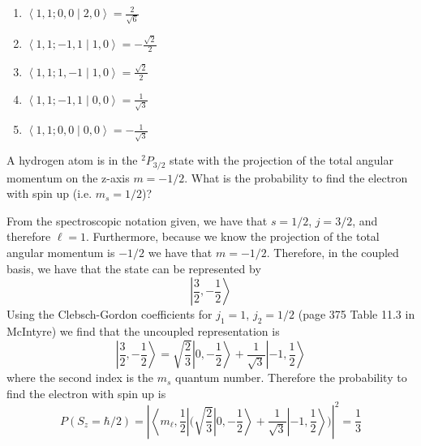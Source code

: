 \documentclass[a4paper, 11pt]{article}
\newcommand{\bra}[1]{\ensuremath{\left\langle#1\right|}}
\newcommand{\ket}[1]{\ensuremath{\left|#1\right\rangle}}
\newcommand{\bracket}[2]{\ensuremath{\left\langle #1 \middle| #2 \right\rangle}}
\newenvironment{solution}{%
	\begin{list}{}{%
			\setlength{\topsep}{0pt}%
			\setlength{\leftmargin}{0.5cm}%
			\setlength{\rightmargin}{0.5cm}%
			\setlength{\listparindent}{\parindent}%
			\setlength{\itemindent}{\parindent}%
			\setlength{\parsep}{\parskip}%
		}%
		\item[]}{\end{list}}
\begin{document}
\begin{enumerate}[leftmargin=0em]
\begin{solution}
\begin{enumerate}[leftmargin=3em, label=(\alph*)]
     \item $\bracket{1,1;0,0}{2,0} = \frac{2}{\sqrt{6}}$
     \item $\bracket{1,1;-1,1}{1,0} = -\frac{\sqrt{2}}{2}$
     \item $\bracket{1,1;1,-1}{1,0} = \frac{\sqrt{2}}{2}$
     \item $\bracket{1,1;-1,1}{0,0} = \frac{1}{\sqrt{3}}$
     \item $\bracket{1,1;0,0}{0,0} = -\frac{1}{\sqrt{3}}$
    \end{enumerate}
  \end{solution}

  
  \item A hydrogen atom is in the $^2P_{3/2}$ state with the projection of the
    total angular momentum on the z-axis $m=-1/2$. What is the probability to
    find the electron with spin up (i.e. $m_s=1/2$)?
    \begin{solution}
      From the spectroscopic notation given, we have that $s=1/2$, $j=3/2$, and
      therefore $\ell = 1$. Furthermore, because we know the projection of the
      total angular momentum is $-1/2$  we have that $m = -1/2$.
      Therefore, in the coupled basis, we have that the state can be represented
      by
      \begin{equation}
        \ket{\frac{3}{2}, -\frac{1}{2}}
      \end{equation}
      Using the Clebsch-Gordon coefficients for $j_1=1$, $j_2=1/2$ (page 375
      Table 11.3 in McIntyre) we find that the uncoupled representation is
      \begin{equation}
        \ket{\frac{3}{2},-\frac{1}{2}} = \sqrt{\frac{2}{3}}\ket{0,-\frac{1}{2}}+\frac{1}{\sqrt{3}}\ket{-1,\frac{1}{2}}
      \end{equation}
      where the second index is the $m_s$ quantum number. Therefore the
      probability to find the electron with spin up is
      \begin{equation}
        P(S_z=\hbar/2) = \left|\bra{m_\ell, \frac{1}{2}}\Big(\sqrt{\frac{2}{3}}\ket{0,-\frac{1}{2}}+\frac{1}{\sqrt{3}}\ket{-1,\frac{1}{2}}\Big)\right|^2 = \frac{1}{3}
      \end{equation}
    \end{solution}
    

\end{enumerate}
\end{document}
